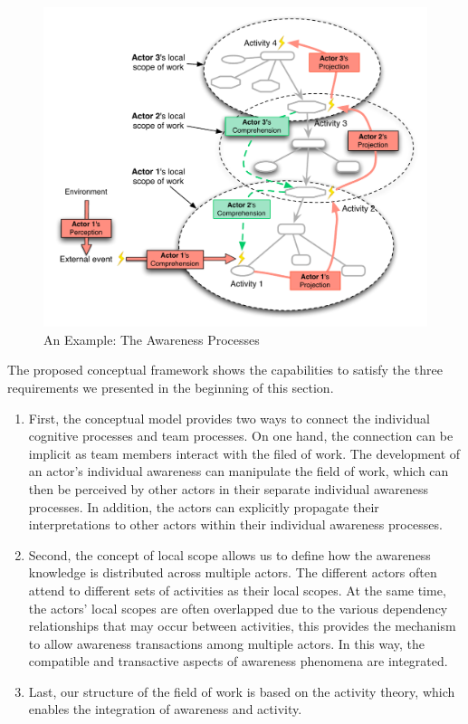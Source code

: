 \begin{figure}[htbp] %
   \centering
   \includegraphics[width=4.5in]{awareness_process.pdf} 
   \caption{An Example: The Awareness Processes}
   \label{fig:awareness_process}
\end{figure}


The proposed conceptual framework shows the capabilities to satisfy the three requirements we presented in the beginning of this section.
\begin{enumerate}
	\item First, the conceptual model provides two ways to connect the individual cognitive processes and team processes. On one hand, the connection can be implicit as team members interact with the filed of work. The development of an actor's individual awareness can manipulate the field of work, which can then be perceived by other actors in their separate individual awareness processes. In addition, the actors can explicitly propagate their interpretations to other actors within their individual awareness processes.
	\item Second, the concept of local scope allows us to define how the awareness knowledge is distributed across multiple actors. The different actors often attend to different sets of activities as their local scopes. At the same time, the actors' local scopes are often overlapped due to the various dependency relationships that may occur between activities, this provides the mechanism to allow awareness transactions among multiple actors. In this way, the compatible and transactive aspects of awareness phenomena are integrated.
	\item Last, our structure of the field of work is based on the activity theory, which enables the integration of awareness and activity.  
\end{enumerate}

